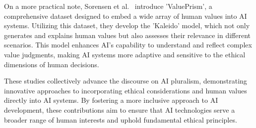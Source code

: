 On a more practical note, Sorensen et al.~\cite{Sorensen_2024} introduce 'ValuePrism', a comprehensive dataset designed to embed a wide array of human values into AI systems. Utilizing this dataset, they develop the 'Kaleido' model, which not only generates and explains human values but also assesses their relevance in different scenarios. This model enhances AI's capability to understand and reflect complex value judgments, making AI systems more adaptive and sensitive to the ethical dimensions of human decisions.

These studies collectively advance the discourse on AI pluralism, demonstrating innovative approaches to incorporating ethical considerations and human values directly into AI systems. By fostering a more inclusive approach to AI development, these contributions aim to ensure that AI technologies serve a broader range of human interests and uphold fundamental ethical principles.


